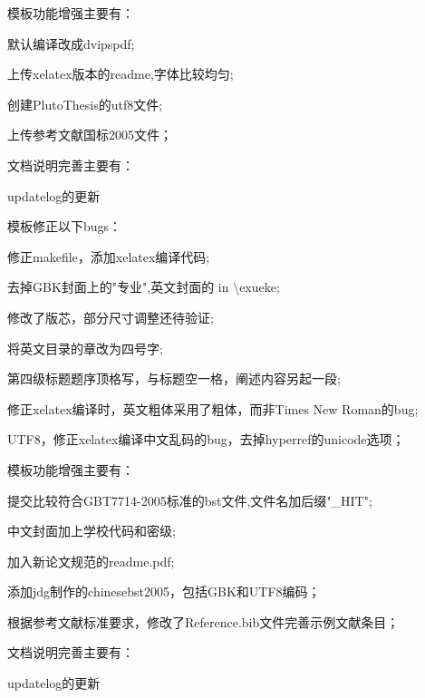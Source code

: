 模板功能增强主要有：
\begin{hitlist}
    \item 默认编译改成dvipspdf;
    \item 上传xelatex版本的readme,字体比较均匀;
    \item 创建PlutoThesis的utf8文件;
    \item 上传参考文献国标2005文件；
\end{hitlist}

文档说明完善主要有：
\begin{hitlist}
   \item  updatelog的更新
\end{hitlist}

模板修正以下bugs：
\begin{hitlist}
    \item 修正makefile，添加xelatex编译代码; 
    \item 去掉GBK封面上的"专业",英文封面的 in \textbackslash exueke; 
    \item 修改了版芯，部分尺寸调整还待验证; 
    \item 将英文目录的章改为四号字; 
    \item 第四级标题题序顶格写，与标题空一格，阐述内容另起一段; 
    \item 修正xelatex编译时，英文粗体采用了粗体，而非Times New Roman的bug;
    \item UTF8，修正xelatex编译中文乱码的bug，去掉hyperref的unicode选项； 
\end{hitlist}


模板功能增强主要有：
\begin{hitlist}
    \item 提交比较符合GBT7714-2005标准的bst文件,文件名加后缀"\_HIT"; 
    \item 中文封面加上学校代码和密级; 
    \item 加入新论文规范的readme.pdf;
    \item 添加jdg制作的chinesebst2005，包括GBK和UTF8编码；
    \item 根据参考文献标准要求，修改了Reference.bib文件完善示例文献条目；
\end{hitlist}

文档说明完善主要有：
\begin{hitlist}
   \item  updatelog的更新
\end{hitlist}
